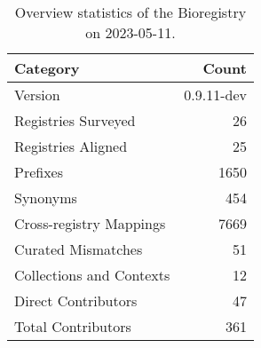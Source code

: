 \begin{table}
\caption{Overview statistics of the Bioregistry on 2023-05-11.}
\label{tab:bioregistry-summary}
\begin{tabular}{lr}
\toprule
Category & Count \\
\midrule
Version & 0.9.11-dev \\
Registries Surveyed & 26 \\
Registries Aligned & 25 \\
Prefixes & 1650 \\
Synonyms & 454 \\
Cross-registry Mappings & 7669 \\
Curated Mismatches & 51 \\
Collections and Contexts & 12 \\
Direct Contributors & 47 \\
Total Contributors & 361 \\
\bottomrule
\end{tabular}
\end{table}
